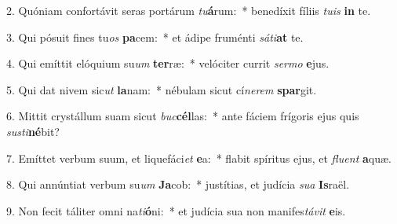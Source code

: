 2. Quóniam confortávit seras portárum \textit{tu}\textbf{á}rum:~*  benedíxit fíliis \textit{tu}\textit{is} \textbf{in} te.\

3. Qui pósuit fines tu\textit{os} \textbf{pa}cem:~*  et ádipe fruménti \textit{sá}\textit{ti}\textbf{at} te.\

4. Qui emíttit elóquium su\textit{um} \textbf{ter}ræ:~*  velóciter currit \textit{ser}\textit{mo} \textbf{e}jus.\

5. Qui dat nivem sic\textit{ut} \textbf{la}nam:~*  nébulam sicut cí\textit{ne}\textit{rem} \textbf{spar}git.\

6. Mittit crystállum suam sicut \textit{buc}\textbf{cél}las:~*  ante fáciem frígoris ejus quis \textit{sus}\textit{ti}\textbf{né}bit?\

7. Emíttet verbum suum, et liquefáci\textit{et} \textbf{e}a:~*  flabit spíritus ejus, et \textit{flu}\textit{ent} \textbf{a}quæ.\

8. Qui annúntiat verbum su\textit{um} \textbf{Ja}cob:~*  justítias, et judícia \textit{su}\textit{a} \textbf{Is}raël.\

9. Non fecit táliter omni na\textit{ti}\textbf{ó}ni:~*  et judícia sua non manifes\textit{tá}\textit{vit} \textbf{e}is.\

